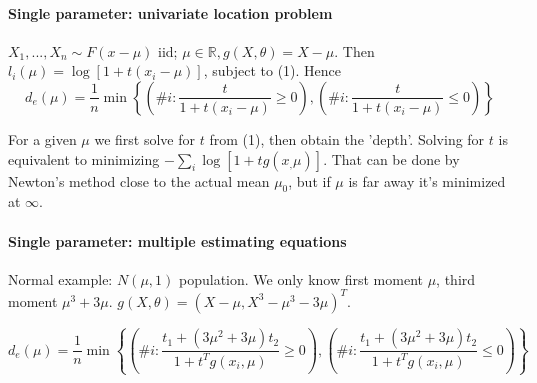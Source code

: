 \documentclass[10pt]{article}
\begin{document}
\paragraph{Single parameter: univariate location problem} $X_1,...,X_n\sim F(x-\mu)$ iid; $\mu\in\mathbb{R}, g(X,\theta) = X-\mu$. Then $l_i(\mu) = \log[1+t(x_i-\mu)]$, subject to (1). Hence
$$ d_e(\mu) = \frac{1}{n} \min\left\{ \left(\#i:\frac{t}{1+t(x_i-\mu)}\geq 0\right),
\left(\#i:\frac{t}{1+t(x_i-\mu)}\leq 0\right) \right\} $$

For a given $\mu$ we first solve for $t$ from (1), then obtain the 'depth'. Solving for $t$ is equivalent to minimizing $-\sum_i\log[1+tg(x_,\mu)]$. That can be done by Newton's method close to the actual mean $\mu_0$, but if $\mu$ is far away it's minimized at $\infty$.

\paragraph{Single parameter: multiple estimating equations}
Normal example: $N(\mu,1)$ population. We only know first moment $\mu$, third moment $\mu^3+3\mu$. $g(X,\theta) = (X-\mu,X^3-\mu^3-3\mu)^T$.

$$ d_e(\mu) = \frac{1}{n} \min\left\{ \left(\#i:\frac{t_1+(3\mu^2+3\mu)t_2}{1+t^Tg(x_i,\mu)}\geq 0\right), \left(\#i:\frac{t_1+(3\mu^2+3\mu)t_2}{1+t^Tg(x_i,\mu)}\leq 0\right) \right\} $$
\end{document}
